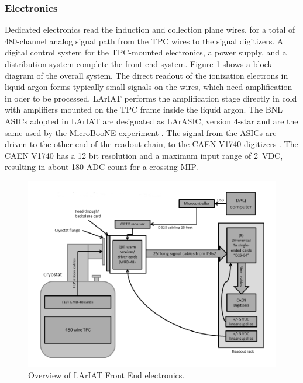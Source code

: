 \subsubsection{Electronics}

Dedicated electronics read the induction and collection plane wires, for a total of  480-channel analog signal path from the TPC wires to the signal digitizers. A digital control system for the TPC-mounted electronics, a power supply, and a distribution system complete the front-end system. Figure \ref{pic:FEelectronics} shows a block diagram of the overall system. The direct readout of the ionization electrons in liquid argon forms typically small signals on the wires, which need amplification in oder to be processed. LArIAT  performs the amplification stage directly in cold with  amplifiers %
mounted on the TPC frame inside the liquid argon. The BNL ASICs adopted in LArIAT are designated as LArASIC, version 4-star and are the same used by the MicroBooNE experiment \cite{Acciarri2017}.
The signal from the ASICs are driven to the other end of the readout chain, to the CAEN V1740 digitizers \cite{CAENV1740}. The CAEN V1740 has a 12 bit resolution and a maximum input range of 2~VDC, resulting in about 180 ADC count for a crossing MIP.   

\begin{figure}[htbp]
 \centering
 \includegraphics[width=1.0\textwidth]{Chapter-3/Images/LArIAT_FE_Electronics.png}
\caption{Overview of LArIAT Front End electronics. } 
\label{pic:FEelectronics}
\end{figure}




